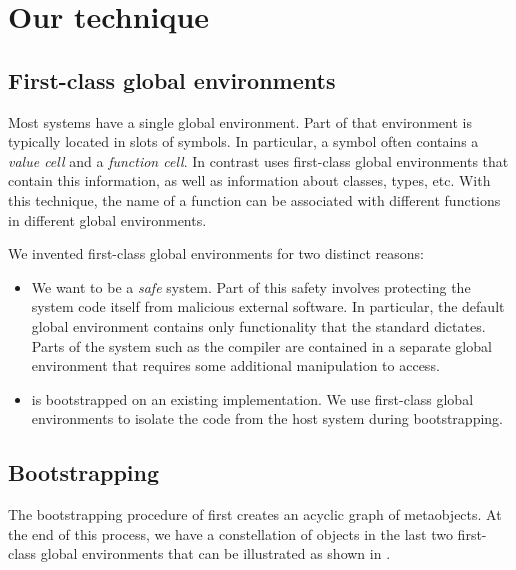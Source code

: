 \section{Our technique}
\label{sec-our-technique}

\subsection{First-class global environments}
\label{sec-first-class-global-environments}

Most \commonlisp{} systems have a single global environment.  Part of
that environment is typically located in slots of symbols.  In
particular, a symbol often contains a \emph{value cell} and a
\emph{function cell}.  In contrast \sicl{} uses first-class global
environments \cite{Strandh:2015:ELS:Environments} that contain this
information, as well as information about classes, types, etc.
With this technique, the name of a function can be associated with
different functions in different global environments.

We invented first-class global environments for two distinct reasons:

\begin{itemize}
\item We want \sicl{} to be a \emph{safe} system.  Part of this safety
  involves protecting the system code itself from malicious external
  software.  In particular, the default global environment contains
  only functionality that the \commonlisp{} standard dictates.  Parts
  of the system such as the compiler are contained in a separate
  global environment that requires some additional manipulation to
  access.
\item \sicl{} is bootstrapped
  \cite{Durand-Strandh:2019:ELS:Bootstrapping} on an existing
  \commonlisp{} implementation.  We use first-class global
  environments to isolate the \sicl{} code from the host system during
  bootstrapping.
\end{itemize}

\subsection{Bootstrapping}

The bootstrapping procedure of \sicl{} first creates an acyclic graph
of metaobjects.  At the end of this process, we have a constellation
of objects in the last two first-class global environments that can be
illustrated as shown in .


